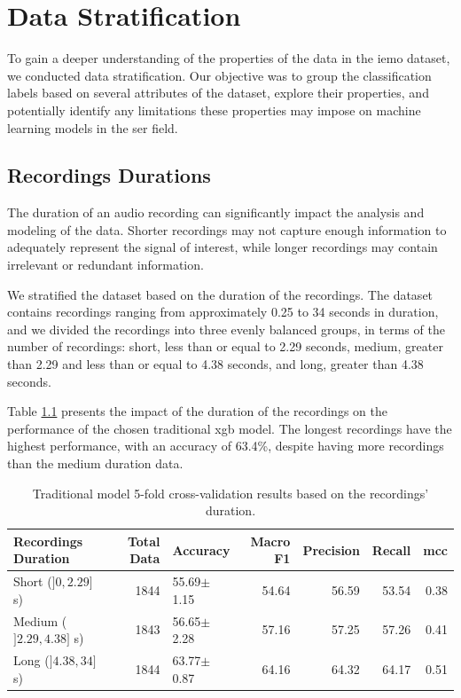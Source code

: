 \chapter{Data Stratification}
\label{chapter:data_stratification}

To gain a deeper understanding of the properties of the data in the \ac{iemo} dataset, we conducted data stratification. Our objective was to group the classification labels based on several attributes of the dataset, explore their properties, and potentially identify any limitations these properties may impose on machine learning models in the \ac{ser} field.

\section{Recordings Durations}

The duration of an audio recording can significantly impact the analysis and modeling of the data. Shorter recordings may not capture enough information to adequately represent the signal of interest, while longer recordings may contain irrelevant or redundant information.

We stratified the dataset based on the duration of the recordings. The dataset contains recordings ranging from approximately 0.25 to 34 seconds in duration, and we divided the recordings into three evenly balanced groups, in terms of the number of recordings: short, less than or equal to  2.29 seconds, medium, greater than 2.29 and less than or equal to 4.38 seconds, and long, greater than 4.38 seconds.

Table \ref{5:durations} presents the impact of the duration of the recordings on the performance of the chosen traditional \ac{xgb} model. The longest recordings have the highest performance, with an accuracy of 63.4\%, despite having more recordings than the medium duration data. 

\begin{table}[H]
	\centering
	\caption{Traditional model 5-fold cross-validation results based on the recordings' duration.}
	\label{5:durations}
	\begin{tabular}{lrlrrrr}
		\toprule
		Recordings Duration &   Total Data & Accuracy    &   Macro F1 &   Precision &   Recall &   \ac{mcc} \\
		\midrule
		Short ($]0, 2.29]$ s)	 	&      1844 & 55.69$\pm$1.15 &   54.64 &  56.59 &  53.54 &  0.38  \\
		Medium ($]2.29, 4.38]$ s) 	&      1843 & 56.65$\pm$2.28 &   57.16 &  57.25 &  57.26 &  0.41 \\
		Long ($]4.38, 34]$ s) 		&      1844 & 63.77$\pm$0.87 &   64.16 &  64.32 &  64.17 &  0.51  \\	
		\bottomrule
	\end{tabular}
\end{table}

